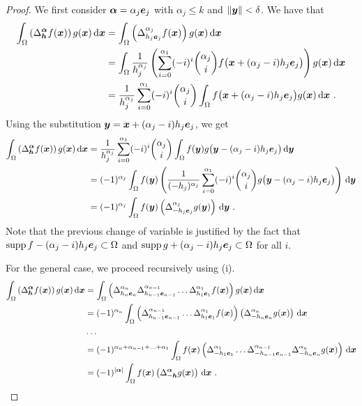 \begin{proof}
 We first consider ${\bm{\alpha}} = \alpha_j {\bm{e}}_j$ with
$\alpha_j \leq k$ and $\|{\bm{y}}\|< \delta$.  We have that
\begin{align*}
\int_{\Omega} \left(\Delta^{{\bm{\alpha}}}_{{\bm{h}}} f ({\bm{x}})\right)
g({\bm{x}}) \,\mathrm{d}{{\bm{x}}}
&= \int_{\Omega} \left(\Delta^{\alpha_j}_{h_j {\bm{e}}_j} f({\bm{x}})\right)
g({\bm{x}}) \,\mathrm{d}{{\bm{x}}} \\
&= \int_{\Omega} \frac{1}{h_j^{\alpha_j}}
\left( \sum_{i=0}^{\alpha_1} (-i)^i \binom{\alpha_j}{i}
f\big({\bm{x}} + (\alpha_j-i) h_j {\bm{e}}_j\big) \right)
g({\bm{x}})\,\mathrm{d}{{\bm{x}}} \\
&= \frac{1}{h_j^{\alpha_j}} \sum_{i=0}^{\alpha_1} (-i)^i \binom{\alpha_j}{i}
\int_{\Omega} f\big({\bm{x}} + (\alpha_j-i) h_j {\bm{e}}_j\big)
g({\bm{x}})\,\mathrm{d}{{\bm{x}}} \ .
\end{align*}
Using the substitution ${\bm{y}} = {\bm{x}} + (\alpha_j-i)h_j{\bm{e}}_j$,
we get
\begin{align*}
\int_{\Omega} \left(\Delta^{{\bm{\alpha}}}_{{\bm{h}}} f ({\bm{x}})\right)
g({\bm{x}}) \,\mathrm{d}{{\bm{x}}}
&= \frac{1}{h_j^{\alpha_j}} \sum_{i=0}^{\alpha_1} (-i)^i \binom{\alpha_j}{i}
\int_{\Omega} f({\bm{y}}) g\big({\bm{y}} - (\alpha_j-i) h_j {\bm{e}}_j\big)
\,\mathrm{d}{{\bm{y}}} \\
&= (-1)^{\alpha_j} \int_{\Omega} f({\bm{y}}) \left( \frac{1}{(-h_j)^{\alpha_j}}
\sum_{i=0}^{\alpha_1} (-i)^i \binom{\alpha_j}{i}
g\big({\bm{y}} - (\alpha_j-i) h_j {\bm{e}}_j\big) \right) \,\mathrm{d}{{\bm{y}}} \\
&= (-1)^{\alpha_j} \int_{\Omega} f({\bm{y}})
\left(\Delta^{\alpha_j}_{-h_j {\bm{e}}_j} g
({\bm{y}})\right)  \,\mathrm{d}{{\bm{y}}} \ .
\end{align*}
Note that the previous change of variable is justified by the fact that
$\operatorname{supp} f - (\alpha_j -i)h_j{\bm{e}}_j \subset \Omega$
and
$\operatorname{supp} g + (\alpha_j -i)h_j{\bm{e}}_j \subset \Omega$
for all $i$.

 For the general case, we proceed recursively using (i).
\begin{align*}
\int_{\Omega} \left(\Delta^{\VEC{\alpha}}_{\VEC{h}} f (\VEC{x})\right) g(\VEC{x})
\dx{\VEC{x}}
&= \int_{\Omega} \left(
\Delta_{h_n\VEC{e}_n}^{\alpha_n} \Delta_{h_{n-1}\VEC{e}_{n-1}}^{\alpha_{n-1}} \ldots
\Delta_{h_1\VEC{e}_1}^{\alpha_1} f (\VEC{x})\right) g(\VEC{x}) \dx{\VEC{x}} \\
&= (-1)^{\alpha_n} \int_{\Omega} \left(
\Delta_{h_{n-1}\VEC{e}_{n-1}}^{\alpha_{n-1}} \ldots
\Delta_{h_1\VEC{e}_1}^{\alpha_1} f (\VEC{x})\right)
\left( \Delta_{-h_n\VEC{e}_n}^{\alpha_n}  g(\VEC{x}) \right) \dx{\VEC{x}} \\
& \ldots \\
&= (-1)^{\alpha_n + \alpha_{n-1} + \ldots + \alpha_1}
\int_{\Omega} f(\VEC{x}) \left( \Delta_{-h_1\VEC{e}_1}^{\alpha_1} \ldots
\Delta_{-h_{n-1}\VEC{e}_{n-1}}^{\alpha_{n-1}} \Delta_{-h_n\VEC{e}_n}^{\alpha_n}
g(\VEC{x})\right) \dx{\VEC{x}} \\
&= (-1)^{|\VEC{\alpha}|} \int_{\Omega} f(\VEC{x})
\left(\Delta^{\VEC{\alpha}}_{-\VEC{h}} g (\VEC{x})\right) \dx{\VEC{x}} \ .
\qedhere
\end{align*}
\end{proof}

